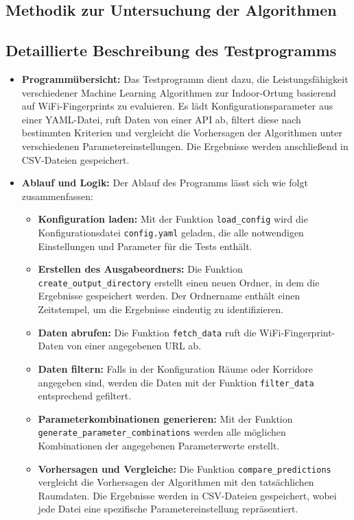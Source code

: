 \subsection{Methodik zur Untersuchung der Algorithmen}
\subsection{Detaillierte Beschreibung des Testprogramms}

\begin{itemize}
    \item \textbf{Programmübersicht:} Das Testprogramm dient dazu, die Leistungsfähigkeit verschiedener Machine Learning Algorithmen zur Indoor-Ortung basierend auf WiFi-Fingerprints zu evaluieren. Es lädt Konfigurationsparameter aus einer YAML-Datei, ruft Daten von einer API ab, filtert diese nach bestimmten Kriterien und vergleicht die Vorhersagen der Algorithmen unter verschiedenen Parametereinstellungen. Die Ergebnisse werden anschließend in CSV-Dateien gespeichert.

    \item \textbf{Ablauf und Logik:} Der Ablauf des Programms lässt sich wie folgt zusammenfassen:
          \begin{itemize}
              \item \textbf{Konfiguration laden:} Mit der Funktion \texttt{load\_config} wird die Konfigurationsdatei \texttt{config.yaml} geladen, die alle notwendigen Einstellungen und Parameter für die Tests enthält.
              \item \textbf{Erstellen des Ausgabeordners:} Die Funktion \texttt{create\_output\_directory} erstellt einen neuen Ordner, in dem die Ergebnisse gespeichert werden. Der Ordnername enthält einen Zeitstempel, um die Ergebnisse eindeutig zu identifizieren.
              \item \textbf{Daten abrufen:} Die Funktion \texttt{fetch\_data} ruft die WiFi-Fingerprint-Daten von einer angegebenen URL ab.
              \item \textbf{Daten filtern:} Falls in der Konfiguration Räume oder Korridore angegeben sind, werden die Daten mit der Funktion \texttt{filter\_data} entsprechend gefiltert.
              \item \textbf{Parameterkombinationen generieren:} Mit der Funktion \texttt{gene\allowbreak rate\_para\allowbreak meter\_\allowbreak com\allowbreak bi\allowbreak nations} werden alle möglichen Kombinationen der angegebenen Parameterwerte erstellt.
              \item \textbf{Vorhersagen und Vergleiche:} Die Funktion \texttt{compare\_predictions} vergleicht die Vorhersagen der Algorithmen mit den tatsächlichen Raumdaten. Die Ergebnisse werden in CSV-Dateien gespeichert, wobei jede Datei eine spezifische Parametereinstellung repräsentiert.
          \end{itemize}


\end{itemize}
